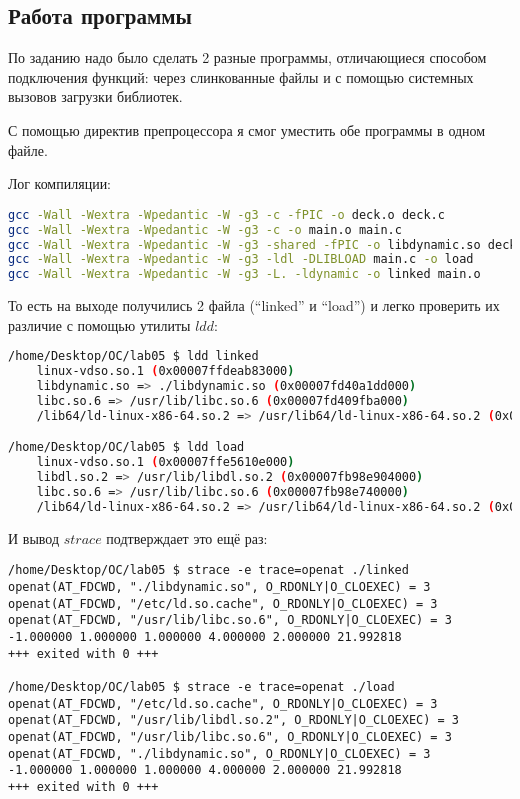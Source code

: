 \documentclass[12pt]{article}
\begin{document}
\subsection*{Работа программы}

\noindent По заданию надо было сделать 2 разные программы, отличающиеся способом подключения функций: через слинкованные файлы и с помощью системных вызовов загрузки библиотек.

\noindent С помощью директив препроцессора я смог уместить обе программы в одном файле.
\newline

\noindent Лог компиляции:
{\scriptsize 
\begin{lstlisting}[language=bash]
gcc -Wall -Wextra -Wpedantic -W -g3 -c -fPIC -o deck.o deck.c
gcc -Wall -Wextra -Wpedantic -W -g3 -c -o main.o main.c
gcc -Wall -Wextra -Wpedantic -W -g3 -shared -fPIC -o libdynamic.so deck.o
gcc -Wall -Wextra -Wpedantic -W -g3 -ldl -DLIBLOAD main.c -o load
gcc -Wall -Wextra -Wpedantic -W -g3 -L. -ldynamic -o linked main.o
\end{lstlisting}
}

\noindent То есть на выходе получились 2 файла (``linked'' и ``load'') и легко проверить их различие с помощью утилиты $ldd$:

{\scriptsize 
\begin{lstlisting}[language=bash]
/home/Desktop/OC/lab05 $ ldd linked
	linux-vdso.so.1 (0x00007ffdeab83000)
	libdynamic.so => ./libdynamic.so (0x00007fd40a1dd000)
	libc.so.6 => /usr/lib/libc.so.6 (0x00007fd409fba000)
	/lib64/ld-linux-x86-64.so.2 => /usr/lib64/ld-linux-x86-64.so.2 (0x00007fd40a1e9000)

/home/Desktop/OC/lab05 $ ldd load
	linux-vdso.so.1 (0x00007ffe5610e000)
	libdl.so.2 => /usr/lib/libdl.so.2 (0x00007fb98e904000)
	libc.so.6 => /usr/lib/libc.so.6 (0x00007fb98e740000)
	/lib64/ld-linux-x86-64.so.2 => /usr/lib64/ld-linux-x86-64.so.2 (0x00007fb98e96f000)
\end{lstlisting}
}

\noindent И вывод $strace$ подтверждает это ещё раз:

{\scriptsize 
\begin{lstlisting}[escapechar=!]
/home/Desktop/OC/lab05 $ strace -e trace=openat ./linked 
openat(AT_FDCWD, "./libdynamic.so", O_RDONLY|O_CLOEXEC) = 3
openat(AT_FDCWD, "/etc/ld.so.cache", O_RDONLY|O_CLOEXEC) = 3
openat(AT_FDCWD, "/usr/lib/libc.so.6", O_RDONLY|O_CLOEXEC) = 3
-1.000000 1.000000 1.000000 4.000000 2.000000 21.992818
+++ exited with 0 +++

/home/Desktop/OC/lab05 $ strace -e trace=openat ./load
openat(AT_FDCWD, "/etc/ld.so.cache", O_RDONLY|O_CLOEXEC) = 3
openat(AT_FDCWD, "/usr/lib/libdl.so.2", O_RDONLY|O_CLOEXEC) = 3
openat(AT_FDCWD, "/usr/lib/libc.so.6", O_RDONLY|O_CLOEXEC) = 3
openat(AT_FDCWD, "./libdynamic.so", O_RDONLY|O_CLOEXEC) = 3
-1.000000 1.000000 1.000000 4.000000 2.000000 21.992818
+++ exited with 0 +++
\end{lstlisting}}
\end{document}
